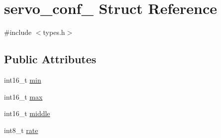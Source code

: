\hypertarget{structservo__conf__}{\section{servo\-\_\-conf\-\_\- Struct Reference}
\label{structservo__conf__}
}


{\ttfamily \#include $<$types.\-h$>$}

\subsection*{Public Attributes}
\begin{DoxyCompactItemize}
\item 
int16\-\_\-t \hyperlink{structservo__conf___a61bf60f37499f4d6b2ca3a38564eb8a1}{min}
\item 
int16\-\_\-t \hyperlink{structservo__conf___ae9cc648469a2047112b7f8c1d5aa48de}{max}
\item 
int16\-\_\-t \hyperlink{structservo__conf___a59045c524c87263a1b4530015dd84b54}{middle}
\item 
int8\-\_\-t \hyperlink{structservo__conf___ab2c11761622958a841cd6a4148e133e8}{rate}
\end{DoxyCompactItemize}


